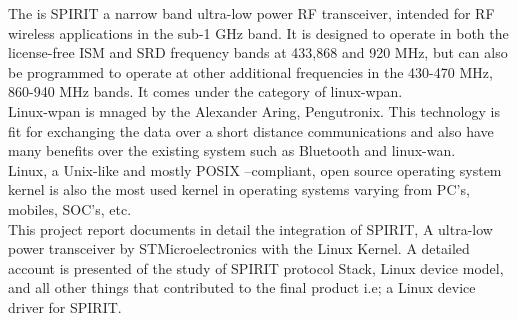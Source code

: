 \begin{Large}
\end{Large}

\vskip 0.1in
\noindent The is SPIRIT a narrow band ultra-low power RF transceiver, intended for RF wireless applications in the sub-1 GHz band. It is designed to operate in both the license-free ISM and SRD frequency bands at 433,868 and 920 MHz, but can also be programmed to operate at other additional frequencies in the 430-470 MHz, 860-940 MHz bands. It comes under the category of linux-wpan.\\
 Linux-wpan is mnaged by the Alexander Aring, Pengutronix. This technology is fit for exchanging the data over a short distance communications and also have many benefits over the existing system such as Bluetooth and linux-wan. \\ 
\noindent Linux, a Unix-like and mostly POSIX –compliant, open source operating system kernel is also the most used kernel in operating systems varying from PC’s, mobiles, SOC’s, etc.\\
\noindent This project report documents in detail the integration of SPIRIT, A ultra-low power transceiver by STMicroelectronics with the Linux Kernel. A detailed account is presented of the study of SPIRIT protocol Stack, Linux device model, and all other things that contributed to the final product i.e; a Linux device driver for SPIRIT.
